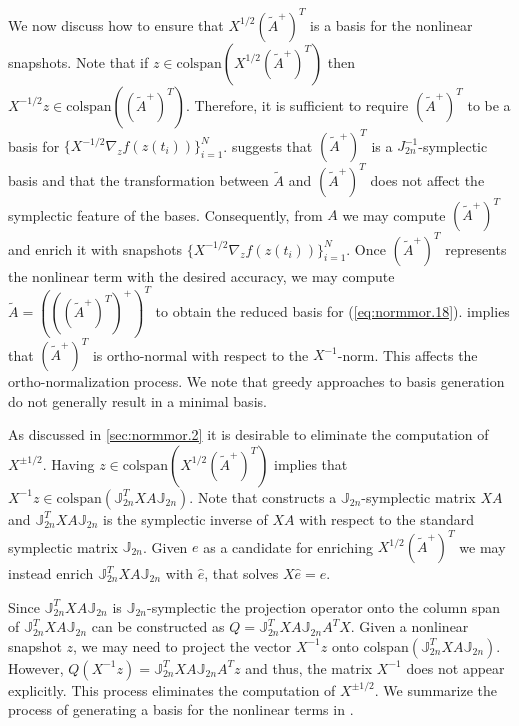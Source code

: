 We now discuss how to ensure that $X^{1/2} (\tilde A^+)^T$ is a basis for the nonlinear snapshots. Note that if $z \in \text{colspan}\left(X^{1/2} (\tilde A^+)^T\right)$ then $X^{-1/2} z \in \text{colspan}\left(( \tilde A^+)^T \right)$. Therefore, it is sufficient to require $(\tilde A^+)^T$ to be a basis for $\{X^{-1/2} \nabla_z f(z(t_i))\}_{i=1}^N$.  suggests that $(\tilde A^+)^T$ is a $J_{2n}^{-1}$-symplectic basis and that the transformation between $\tilde A$ and $(\tilde A^+)^T $ does not affect the symplectic feature of the bases. Consequently, from $A$ we may compute $(\tilde A^+)^T$ and enrich it with snapshots $\{X^{-1/2} \nabla_z f(z(t_i))\}_{i=1}^N$. Once $(\tilde A^+)^T$ represents the nonlinear term with the desired accuracy, we may compute $\tilde A= \left( \left( ( \tilde A^+ )^T \right)^+ \right)^T$ to obtain the reduced basis for (\ref{eq:normmor.18}).  implies that $(\tilde A^+)^T$ is ortho-normal with respect to the $X^{-1}$-norm. This affects the ortho-normalization process. We note that greedy approaches to basis generation do not generally result in a minimal basis.

As discussed in \cref{sec:normmor.2} it is desirable to eliminate the computation of $X^{\pm 1/2}$. Having $z \in \text{colspan}\left(X^{1/2} (\tilde A^+)^T\right)$ implies that $X^{-1} z \in \text{colspan}(\mathbb J_{2n}^T X A \mathbb J_{2n})$. Note that  constructs a $\mathbb J_{2n}$-symplectic matrix $XA$ and $\mathbb J_{2n}^T X A \mathbb J_{2n}$ is the symplectic inverse of $XA$ with respect to the standard symplectic matrix $\mathbb J_{2n}$. Given $e$ as a candidate for enriching $X^{1/2} (\tilde A^+)^T$ we may instead enrich $\mathbb J_{2n}^T X A \mathbb J_{2n}$ with $\hat e$, that solves $X \hat e = e$.

Since  $\mathbb J_{2n}^T X A \mathbb J_{2n}$ is $\mathbb J_{2n}$-symplectic the projection operator onto the column span of $\mathbb J_{2n}^T X A \mathbb J_{2n}$ can be constructed as $Q=\mathbb J_{2n}^T X A \mathbb J_{2n}A^TX$. Given a nonlinear snapshot $z$, we may need to project the vector $X^{-1}z$ onto colspan$(\mathbb J_{2n}^T X A \mathbb J_{2n})$. However, $Q(X^{-1}z)=\mathbb J_{2n}^T X A \mathbb J_{2n}A^Tz$ and thus, the matrix $X^{-1}$ does not appear explicitly. This process eliminates the computation of $X^{\pm 1/2}$. We summarize the process of generating a basis for the nonlinear terms in .

